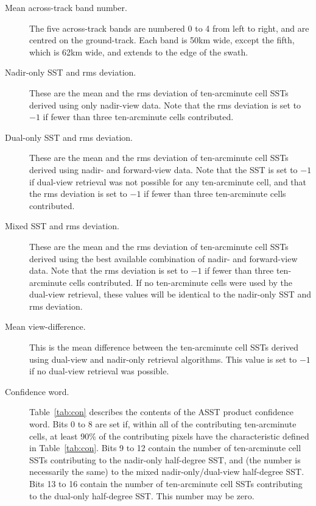 \begin{description}
\item[Mean across-track band number.] The five across-track bands are numbered
0 to 4 from left to right,  and are centred on the ground-track. 
Each band is 50{\thinspace}km 
wide, except the fifth, which is 62{\thinspace}km wide, and extends to the 
edge of the swath. 

                   
\item[Nadir-only SST and rms deviation.] These are the mean and the rms
deviation of ten-arcminute cell SSTs derived using only
nadir-view data. Note that the rms deviation is set to $-1$ if fewer than three
ten-arcminute cells contributed. 

\item[Dual-only SST and rms deviation.] These are the mean and the rms 
deviation of ten-arcminute cell SSTs derived using
nadir- and forward-view data. Note that the SST is set to $-1$
if dual-view retrieval was not possible for any ten-arcminute cell, and
that the rms deviation is set to $-1$ if fewer than three ten-arcminute cells
contributed. 

\item[Mixed SST and rms deviation.] These are the mean and the rms  deviation
of ten-arcminute cell SSTs derived using the best
available combination of nadir- and forward-view data. Note that the
rms deviation is set to  $-1$ if fewer than three ten-arcminute cells 
contributed.
If no ten-arcminute cells were used by the dual-view retrieval, these
values will be identical to the nadir-only SST and rms deviation.

\item[Mean view-difference.] This is the mean difference between the
ten-arcminute cell SSTs derived using dual-view and
nadir-only retrieval algorithms. This value is set to $-1$ if no dual-view 
retrieval was possible. 

\item[Confidence word.] Table~\ref{tab:con} describes the contents of the
ASST product confidence word. 
Bits 0 to 8 are set if, within all of the contributing ten-arcminute cells,
at least 90\% of the contributing pixels have the
characteristic defined in Table~\ref{tab:con}. 
Bits 9 to 12 contain the number of ten-arcminute cell SSTs 
contributing to the nadir-only half-degree SST, 
and (the number is necessarily the same) to the mixed
nadir-only/dual-view half-degree SST.
Bits 13 to 16 contain the number of ten-arcminute cell SSTs 
contributing to the dual-only half-degree SST. 
This number may be zero. 


\end{description}

